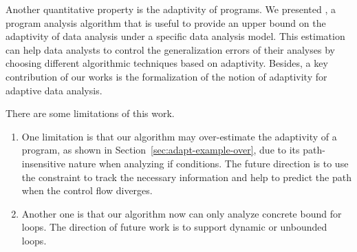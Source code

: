  Another quantitative property is the adaptivity of programs. We presented {\ADAPTSYSTEM}, a program analysis algorithm that is useful to provide an upper bound on the adaptivity of data analysis under a specific data analysis model. This estimation can help data analysts to control the generalization errors of their analyses by choosing different algorithmic techniques based on adaptivity. Besides, a key contribution of our works is the formalization of the notion of adaptivity for adaptive data analysis. 

 There are some limitations of this work. 
 \begin{enumerate}
     \item One limitation is that our algorithm may over-estimate the adaptivity of a program, as shown in Section~\ref{sec:adapt-example-over}, due to its path-insensitive nature when analyzing if conditions. The future direction is to use the constraint to track the necessary information and help to predict the path when the control flow diverges.
     \item Another one is that our algorithm now can only analyze concrete bound for loops. The direction of future work is to support dynamic or unbounded loops. 
 \end{enumerate}
 
